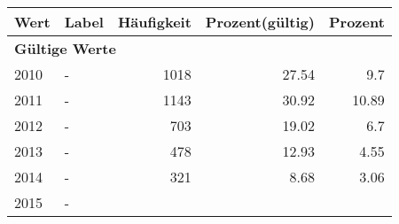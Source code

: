      \begin{longtable}{lXrrr}
     \toprule
     \textbf{Wert} & \textbf{Label} & \textbf{Häufigkeit} & \textbf{Prozent(gültig)} & \textbf{Prozent} \\
     \endhead
     \midrule
     \multicolumn{5}{l}{\textbf{Gültige Werte}}\\

     2010 &
     \multicolumn{1}{X}{ -  } &


       \num{1018} &
       \num[round-mode=places,round-precision=2]{27,54} &
         \num[round-mode=places,round-precision=2]{9,7} \\

     2011 &
     \multicolumn{1}{X}{ -  } &


       \num{1143} &
       \num[round-mode=places,round-precision=2]{30,92} &
         \num[round-mode=places,round-precision=2]{10,89} \\

     2012 &
     \multicolumn{1}{X}{ -  } &


       \num{703} &
       \num[round-mode=places,round-precision=2]{19,02} &
         \num[round-mode=places,round-precision=2]{6,7} \\

     2013 &
     \multicolumn{1}{X}{ -  } &


       \num{478} &
       \num[round-mode=places,round-precision=2]{12,93} &
         \num[round-mode=places,round-precision=2]{4,55} \\

     2014 &
     \multicolumn{1}{X}{ -  } &


       \num{321} &
       \num[round-mode=places,round-precision=2]{8,68} &
         \num[round-mode=places,round-precision=2]{3,06} \\

     2015 &
     \multicolumn{1}{X}{ -  } &



\end{longtable}
